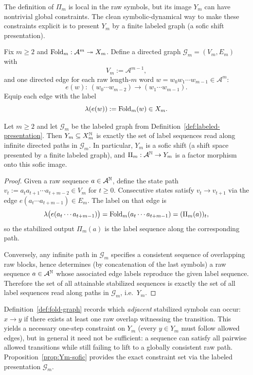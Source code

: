 The definition of $\Pi_m$ is local in the raw symbols, but its image $Y_m$ can have nontrivial global constraints. The clean symbolic-dynamical way to make these constraints explicit is to present $Y_m$ by a finite labeled graph (a sofic shift presentation).

\begin{definition}\label{def:labeled-presentation}
Fix $m\ge 2$ and $\mathrm{Fold}_m:\mathcal{A}^m\twoheadrightarrow X_m$.
Define a directed graph $\mathcal{G}_m=(V_m,E_m)$ with
\[
V_m:=\mathcal{A}^{m-1},
\]
and one directed edge for each raw length-$m$ word $w=w_0w_1\cdots w_{m-1}\in\mathcal{A}^m$:
\[
e(w):\ (w_0\cdots w_{m-2})\longrightarrow (w_1\cdots w_{m-1}).
\]
Equip each edge with the label
\[
\lambda(e(w)):=\mathrm{Fold}_m(w)\in X_m.
\]
\end{definition}

\begin{proposition}\label{prop:Ym-sofic}
Let $m\ge 2$ and let $\mathcal{G}_m$ be the labeled graph from Definition~\ref{def:labeled-presentation}. Then $Y_m\subseteq X_m^{\mathbb{N}}$ is exactly the set of label sequences read along infinite directed paths in $\mathcal{G}_m$. In particular, $Y_m$ is a sofic shift (a shift space presented by a finite labeled graph), and $\Pi_m:\mathcal{A}^{\mathbb{N}}\to Y_m$ is a factor morphism onto this sofic image.
\end{proposition}

\begin{proof}
Given a raw sequence $a\in\mathcal{A}^{\mathbb{N}}$, define the state path $v_t:=a_ta_{t+1}\cdots a_{t+m-2}\in V_m$ for $t\ge 0$. Consecutive states satisfy $v_t\to v_{t+1}$ via the edge $e(a_t\cdots a_{t+m-1})\in E_m$. The label on that edge is
\[
\lambda\bigl(e(a_t\cdots a_{t+m-1})\bigr)=\mathrm{Fold}_m(a_t\cdots a_{t+m-1})=(\Pi_m(a))_t,
\]
so the stabilized output $\Pi_m(a)$ is the label sequence along the corresponding path.

Conversely, any infinite path in $\mathcal{G}_m$ specifies a consistent sequence of overlapping raw blocks, hence determines (by concatenation of the last symbols) a raw sequence $a\in\mathcal{A}^{\mathbb{N}}$ whose associated edge labels reproduce the given label sequence. Therefore the set of all attainable stabilized sequences is exactly the set of all label sequences read along paths in $\mathcal{G}_m$, i.e.\ $Y_m$.
\end{proof}

\begin{remark}\label{rem:fold-graph-vs-sofic}
Definition~\ref{def:fold-graph} records which \emph{adjacent} stabilized symbols can occur: $x\to y$ if there exists at least one raw overlap witnessing the transition.
This yields a necessary one-step constraint on $Y_m$ (every $y\in Y_m$ must follow allowed edges), but in general it need not be sufficient: a sequence can satisfy all pairwise allowed transitions while still failing to lift to a globally consistent raw path. Proposition~\ref{prop:Ym-sofic} provides the exact constraint set via the labeled presentation $\mathcal{G}_m$.
\end{remark}

